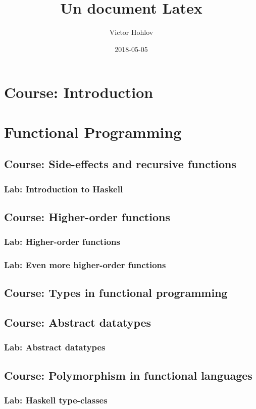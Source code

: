 \documentclass[a4paper, 12pt]{report}
\title{Un document Latex}
\author{Victor Hohlov}
\date{2018-05-05 }
\begin{document}
\maketitle
\tableofcontents
\chapter{ Course: Introduction }

\chapter{Functional Programming }
\section{ Course: Side-effects and recursive functions }

\subsection{ Lab: Introduction to Haskell}

\section{ Course: Higher-order functions}

\subsection{ Lab: Higher-order functions}

\subsection{ Lab: Even more higher-order functions}

\section{ Course: Types in functional programming}

\section{ Course: Abstract datatypes}

\subsection{ Lab: Abstract datatypes}

\section{ Course: Polymorphism in functional languages}

\subsection{ Lab: Haskell type-classes}

\end{document}

